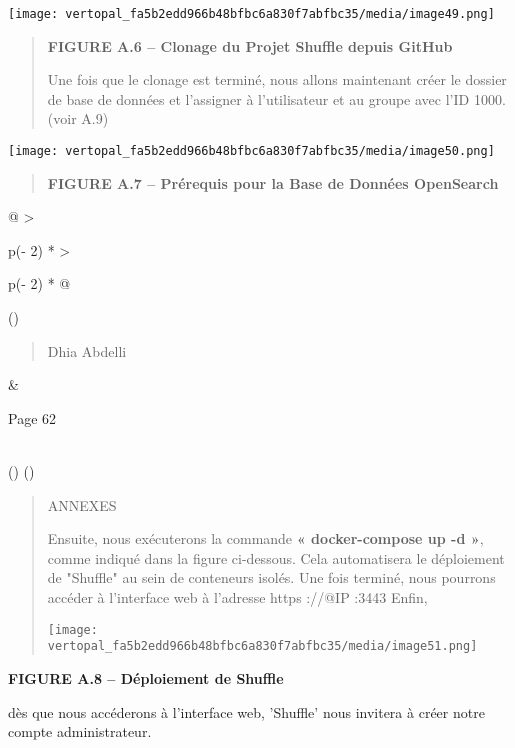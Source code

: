 \documentclass[
]{article}
\begin{document}
\texttt{[image: vertopal\_fa5b2edd966b48bfbc6a830f7abfbc35/media/image49.png]}

\begin{quote}
\textbf{FIGURE A.6 -- Clonage du Projet Shuffle depuis GitHub}

Une fois que le clonage est terminé, nous allons maintenant créer le
dossier de base de données et l'assigner à l'utilisateur et au groupe
avec l'ID 1000.(voir A.9)
\end{quote}

\texttt{[image: vertopal\_fa5b2edd966b48bfbc6a830f7abfbc35/media/image50.png]}

\begin{quote}
\textbf{FIGURE A.7 -- Prérequis pour la Base de Données OpenSearch}
\end{quote}

\begin{longtable}[]{@{}
  >{\raggedright\arraybackslash}p{(\columnwidth - 2\tabcolsep) * }
  >{\raggedright\arraybackslash}p{(\columnwidth - 2\tabcolsep) * }@{}}
\toprule()
\begin{minipage}[b]{\linewidth}\raggedright
\begin{quote}
Dhia Abdelli
\end{quote}
\end{minipage} & \begin{minipage}[b]{\linewidth}\raggedright
Page 62
\end{minipage} \\
\midrule()
\endhead
\bottomrule()
\end{longtable}

\begin{quote}
ANNEXES

Ensuite, nous exécuterons la commande \textbf{« docker-compose up -d »},
comme indiqué dans la figure ci-dessous. Cela automatisera le
déploiement de "Shuffle" au sein de conteneurs isolés. Une fois terminé,
nous pourrons accéder à l'interface web à l'adresse https ://@IP :3443
Enfin,

\texttt{[image: vertopal\_fa5b2edd966b48bfbc6a830f7abfbc35/media/image51.png]}
\end{quote}

\textbf{FIGURE A.8 -- Déploiement de Shuffle}

dès que nous accéderons à l'interface web, 'Shuffle' nous invitera à
créer notre compte administrateur.
\end{document}
